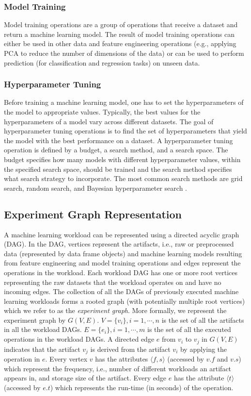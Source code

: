 \subsubsection{Model Training}
Model training operations are a group of operations that receive a dataset and return a machine learning model.
The result of model training operations can either be used in other data and feature engineering operations (e.g., applying PCA to reduce the number of dimensions of the data) or can be used to perform prediction (for classification and regression tasks) on unseen data.

\subsubsection{Hyperparameter Tuning}
Before training a machine learning model, one has to set the hyperparameters of the model to appropriate values.
Typically, the best values for the hyperparameters of a model vary across different datasets.
The goal of hyperparameter tuning operations is to find the set of hyperparameters that yield the model with the best performance on a dataset.
A hyperparameter tuning operation is defined by a budget, a search method, and a search space.
The budget specifies how many models with different hyperparameter values, within the specified search space, should be trained and the search method specifies what search strategy to incorporate.
The most common search methods are grid search, random search, and Bayesian hyperparameter search \cite{bergstra2012random,snoek2012practical}.


\subsection{Experiment Graph Representation}\label{sub-graph-construction}
A machine learning workload can be represented using a directed acyclic graph (DAG).
In the DAG, vertices represent the artifacts, i.e., raw or preprocessed data (represented by data frame objects) and machine learning models resulting from feature engineering and model training operations and edges represent the operations in the workload.
Each workload DAG has one or more root vertices representing the raw datasets that the workload operates on and have no incoming edges.
The collection of all the DAGs of previously executed machine learning workloads forms a rooted graph (with potentially multiple root vertices) which we refer to as the \textit{experiment graph}.
More formally, we represent the experiment graph by $G(V, E)$.
$V=\{v_i\}, i = 1, \cdots, n$ is the set of all the artifacts in all the workload DAGs.
$E=\{e_i\}, i = 1, \cdots, m$ is the set of all the executed operations in the workload DAGs.
A directed edge $e$ from $v_i$ to $v_j$ in $G(V, E)$ indicates that the artifact $v_j$ is derived from the artifact $v_i$ by applying the operation in $e$.
Every vertex $v$ has the attributes $\langle f, s \rangle$ (accessed by $v.f$ and $v.s$) which represent the frequency, i.e., number of different workloads an artifact appears in, and storage size of the artifact.
Every edge $e$ has the attribute $\langle t \rangle$ (accessed by $e.t$) which represents the run-time (in seconds) of the operation.

